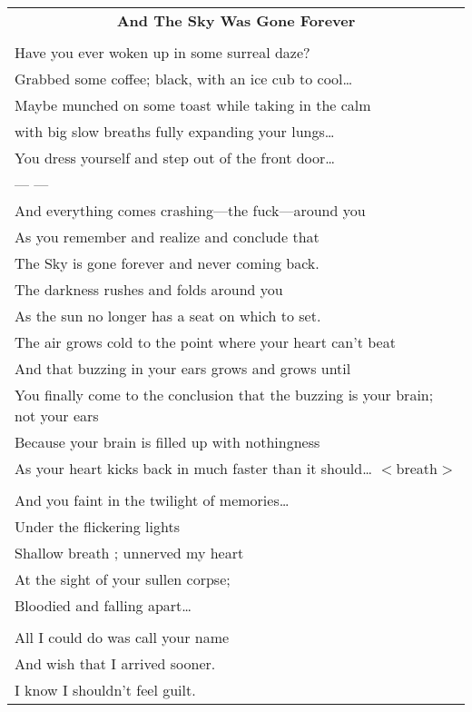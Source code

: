 \documentclass{article}
\begin{document}
\newcommand{\h}{\hspace*{4ex}}

\begin{center}
\begin{tabular}{l}
\multicolumn{1}{c}{\large\textbf{And The Sky Was Gone Forever}} \\
\\
Have you ever woken up in some surreal daze? \\
Grabbed some coffee; black, with an ice cub to cool\ldots{} \\
Maybe munched on some toast while taking in the calm \\
with big slow breaths fully expanding your lungs\ldots{} \\
You dress yourself and step out of the front door\ldots{} \\
--- ---\\
And everything comes crashing---the fuck---around you \\
As you remember and realize and conclude that \\
The Sky is gone forever and never coming back. \\
The darkness rushes and folds around you \\
As the sun no longer has a seat on which to set. \\
The air grows cold to the point where your heart can't beat \\
And that buzzing in your ears grows and grows until \\
You finally come to the conclusion that the buzzing is your brain; not your ears \\
Because your brain is filled up with nothingness \\
As your heart kicks back in much faster than it should\ldots{} $<$breath$>$ \\
\\
\h{}And you faint in the twilight of memories\ldots{} \\
\h{}Under the flickering lights \\
\h{}Shallow breath ; unnerved my heart \\
\h{}At the sight of your sullen corpse; \\
\h{}Bloodied and falling apart\ldots{} \\
\\
\h{}All I could do was call your name \\
\h{}And wish that I arrived sooner. \\
\h{}I know I shouldn't feel guilt. \\

\end{tabular}
\end{center}
\end{document}
